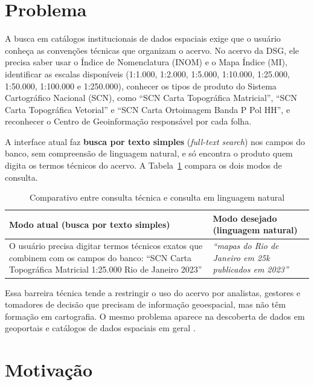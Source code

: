 \section{Problema}

A busca em catálogos institucionais de dados espaciais exige que o usuário conheça as convenções técnicas que organizam o acervo. No acervo da DSG, ele precisa saber usar o Índice de Nomenclatura (INOM) e o Mapa Índice (MI), identificar as escalas disponíveis (1:1.000, 1:2.000, 1:5.000, 1:10.000, 1:25.000, 1:50.000, 1:100.000 e 1:250.000), conhecer os tipos de produto do Sistema Cartográfico Nacional (SCN), como ``SCN Carta Topográfica Matricial'', ``SCN Carta Topográfica Vetorial'' e ``SCN Carta Ortoimagem Banda P Pol HH'', e reconhecer o Centro de Geoinformação responsável por cada folha.

A interface atual faz \textbf{busca por texto simples} (\textit{full-text search}) nos campos do banco, sem compreensão de linguagem natural, e só encontra o produto quem digita os termos técnicos do acervo. A Tabela~\ref{tab:exemplo_consulta} compara os dois modos de consulta.

\begin{table}[h]
\centering
\caption{Comparativo entre consulta técnica e consulta em linguagem natural}
\label{tab:exemplo_consulta}
\begin{tabular}{|p{}|p{}|}
\hline
\textbf{Modo atual (busca por texto simples)} & \textbf{Modo desejado (linguagem natural)} \\
\hline
O usuário precisa digitar termos técnicos exatos que combinem com os campos do banco: ``SCN Carta Topográfica Matricial 1:25.000 Rio de Janeiro 2023'' & \textit{``mapas do Rio de Janeiro em 25k publicados em 2023''} \\
\hline
\end{tabular}
\end{table}

Essa barreira técnica tende a restringir o uso do acervo por analistas, gestores e tomadores de decisão que precisam de informação geoespacial, mas não têm formação em cartografia. O mesmo problema aparece na descoberta de dados em geoportais e catálogos de dados espaciais em geral \cite{hu2015metadata, li2025question}.

\section{Motivação}

